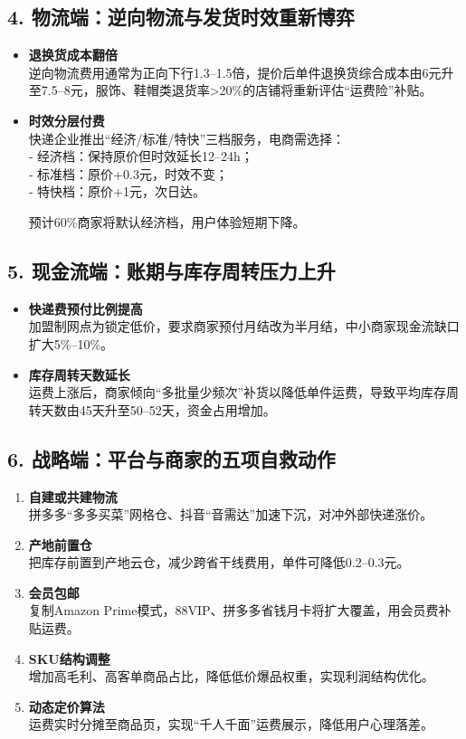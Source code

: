 \subsection{4. 物流端：逆向物流与发货时效重新博弈}
\begin{itemize}
  \item \textbf{退换货成本翻倍}  \\
  逆向物流费用通常为正向下行1.3–1.5倍，提价后单件退换货综合成本由6元升至7.5–8元，服饰、鞋帽类退货率>20\%的店铺将重新评估“运费险”补贴。
  \item \textbf{时效分层付费}  \\
  快递企业推出“经济/标准/特快”三档服务，电商需选择：\\
    {\color{red} 
    ‑ 经济档：保持原价但时效延长12–24h；  \\
  ‑ 标准档：原价+0.3元，时效不变；  \\
  ‑ 特快档：原价+1元，次日达。
   }  
 
  预计60\%商家将默认经济档，用户体验短期下降。
\end{itemize}

\subsection{5. 现金流端：账期与库存周转压力上升}
\begin{itemize}
  \item \textbf{快递费预付比例提高}  \\
  加盟制网点为锁定低价，要求商家预付月结改为半月结，中小商家现金流缺口扩大5\%–10\%。
  \item \textbf{库存周转天数延长}  \\
  运费上涨后，商家倾向“多批量少频次”补货以降低单件运费，导致平均库存周转天数由45天升至50–52天，资金占用增加。
\end{itemize}

\subsection{6. 战略端：平台与商家的五项自救动作}
\begin{enumerate}[label=\arabic*.]
  \item \textbf{自建或共建物流}  \\
  拼多多“多多买菜”网格仓、抖音“音需达”加速下沉，对冲外部快递涨价。
  \item \textbf{产地前置仓}  \\
  把库存前置到产地云仓，减少跨省干线费用，单件可降低0.2–0.3元。
  \item {\color{red}\textbf{会员包邮} } \\
  复制Amazon Prime模式，88VIP、拼多多省钱月卡将扩大覆盖，用会员费补贴运费。
  \item \textbf{SKU结构调整}  \\
  增加高毛利、高客单商品占比，降低低价爆品权重，实现利润结构优化。
  \item \textbf{动态定价算法}  \\
  运费实时分摊至商品页，实现“千人千面”运费展示，降低用户心理落差。
\end{enumerate}

